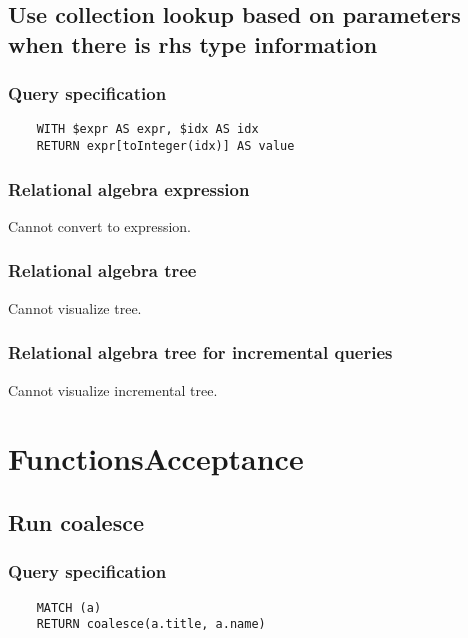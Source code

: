 	\subsection{Use collection lookup based on parameters when there is rhs type information}

	\subsubsection*{Query specification}

	\begin{lstlisting}
	WITH $expr AS expr, $idx AS idx
	RETURN expr[toInteger(idx)] AS value
	\end{lstlisting}


	\subsubsection*{Relational algebra expression}

	Cannot convert to expression.

	\subsubsection*{Relational algebra tree}

	Cannot visualize tree.

	\subsubsection*{Relational algebra tree for incremental queries}

	Cannot visualize incremental tree.

	\section{FunctionsAcceptance}

	\subsection{Run coalesce}

	\subsubsection*{Query specification}

	\begin{lstlisting}
	MATCH (a)
	RETURN coalesce(a.title, a.name)
	\end{lstlisting}


